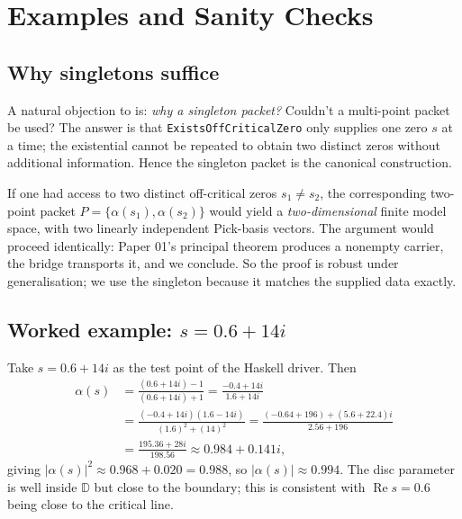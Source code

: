 \documentclass[12pt]{article}
\theoremstyle{definition}
\theoremstyle{remark}
\newcommand{\Disc}{\mathbb{D}}
\newcommand{\re}{\operatorname{Re}}
\begin{document}
\section{Examples and Sanity Checks}\label{sec:examples}

\subsection{Why singletons suffice}

A natural objection to  is: \emph{why a singleton
packet?} Couldn't a multi-point packet be used? The answer is that
\texttt{ExistsOffCriticalZero} only supplies one zero $s$ at a time; the
existential cannot be repeated to obtain two distinct zeros without
additional information. Hence the singleton packet is the canonical
construction.

If one had access to two distinct off-critical zeros $s_{1}\neq s_{2}$,
the corresponding two-point packet
$P = \{\alpha(s_{1}), \alpha(s_{2})\}$ would yield a
\emph{two-dimensional} finite model space, with two linearly independent
Pick-basis vectors. The argument would proceed identically: Paper 01's
principal theorem produces a nonempty carrier, the bridge transports it,
and we conclude. So the proof is robust under generalisation; we use the
singleton because it matches the supplied data exactly.

\subsection{Worked example: $s = 0.6 + 14i$}

Take $s = 0.6 + 14i$ as the test point of the Haskell driver. Then
\begin{align*}
\alpha(s) &= \frac{(0.6 + 14i) - 1}{(0.6 + 14i) + 1}
            = \frac{-0.4 + 14i}{1.6 + 14i} \\
          &= \frac{(-0.4 + 14i)(1.6 - 14i)}{(1.6)^{2} + (14)^{2}}
            = \frac{(-0.64 + 196) + (5.6 + 22.4)i}{2.56 + 196} \\
          &= \frac{195.36 + 28i}{198.56}
            \approx 0.984 + 0.141i,
\end{align*}
giving $|\alpha(s)|^{2} \approx 0.968 + 0.020 = 0.988$, so
$|\alpha(s)|\approx 0.994$. The disc parameter is well inside $\Disc$ but
close to the boundary; this is consistent with $\re s = 0.6$ being close
to the critical line.
\end{document}
